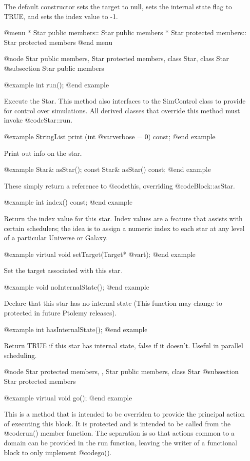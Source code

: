 The default constructor sets the target to null, sets the internal
state flag to TRUE, and sets the index value to -1.

@menu
* Star public members::         Star public members
* Star protected members::      Star protected members
@end menu

@node Star public members, Star protected members, class Star, class Star
@subsection Star public members

@example
int run();
@end example

Execute the Star.  This method also interfaces to the SimControl
class to provide for control over simulations.  All derived classes
that override this method must invoke @code{Star::run}.

@example
StringList print (int @var{verbose} = 0) const;
@end example

Print out info on the star.

@example
Star& asStar();
const Star& asStar() const;
@end example

These simply return a reference to @code{this}, overriding @code{Block::asStar}.

@example
int index() const;
@end example

Return the index value for this star.  Index values are a feature
that assists with certain schedulers; the idea is to assign a numeric
index to each star at any level of a particular Universe or Galaxy.

@example
virtual void setTarget(Target* @var{t});
@end example

Set the target associated with this star.

@example
void noInternalState();
@end example

Declare that this star has no internal state (This function may
change to protected in future Ptolemy releases).

@example
int hasInternalState();
@end example

Return TRUE if this star has internal state, false if it doesn't.
Useful in parallel scheduling.

@node Star protected members,  , Star public members, class Star
@subsection Star protected members

@example
virtual void go();
@end example

This is a method that is intended to be overriden to provide the
principal action of executing this block.  It is protected and is
intended to be called from the @code{run()} member function.  The
separation is so that actions common to a domain can be provided
in the run function, leaving the writer of a functional block to
only implement @code{go()}.

